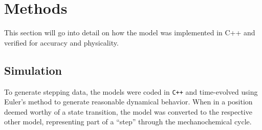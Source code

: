\documentclass[
11pt, %
english, %
singlespacing, %
headsepline, %
chapterinoneline, %
]{MastersDoctoralThesis} %
\begin{document}





\newpage
\chapter{Methods}
\label{chap:Methods}
This section will go into detail on how the model was implemented in C++ and verified for accuracy and physicality.\\

\section{Simulation}
To generate stepping data, the models were coded in \verb|C++| and time-evolved using Euler's method to generate reasonable dynamical behavior. When in a position deemed worthy of a state transition, the model was converted to the respective other model, representing part of a ``step'' through the mechanochemical cycle.\\
\end{document}
